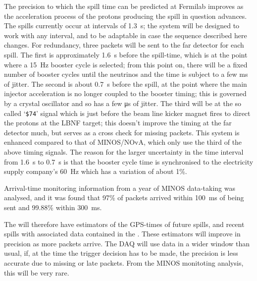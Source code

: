 The precision to which the spill time can be predicted at Fermilab
improves as the acceleration process of the protons producing the
spill in question advances.  The spills currently occur at intervals
of \SI{1.3}{\s}; the system will be designed to work with any interval, and
to be adaptable in case the sequence described here changes.  For
redundancy, three packets will be sent to the far detector for each
spill.  The first is approximately \SI{1.6}{\s} before the spill-time, which
is at the point where a \SI{15}{\Hz} booster cycle is selected; from this
point on, there will be a fixed number of booster cycles until the
neutrinos and the time is subject to a few ms of jitter.  The second
is about \SI{0.7}{\s} before the spill, at the point where the main injector
acceleration is no longer coupled to the booster timing; this is
governed by a crystal oscillator and so has a few \si{\us} of jitter.
The third will be at the so called `\texttt{\$74}' signal which is just before the beam line kicker magnet fires
to direct the protons at the LBNF target; this doesn't improve the
timing at the far detector much, but serves as a cross check for
missing packets.  This system is enhanced compared to that of
MINOS/NOvA, which only use the third of the above timing signals.  The
reason for the larger uncertainty in the time interval from \SI{1.6}{\s} to
\SI{0.7}{\s} is that the booster cycle time is synchronised to the
electricity supply company's \SI{60}{\Hz} which has a variation of about
1\%.

Arrival-time monitoring information from a year of MINOS data-taking
was analysed, and it was found that 97\% of packets arrived within
\SI{100}{\ms} of being sent and 99.88\% within \SI{300}{\ms}.

The  will therefore have estimators of the GPS-times of
future spills, and recent spills with associated data contained in the
. These estimators will improve in precision as
more packets arrive.  The DAQ will use data in a wider window than
usual, if, at the time the trigger decision has to be made, the
precision is less accurate due to missing or late packets.  From the
MINOS monitoting analysis, this will be very rare.

